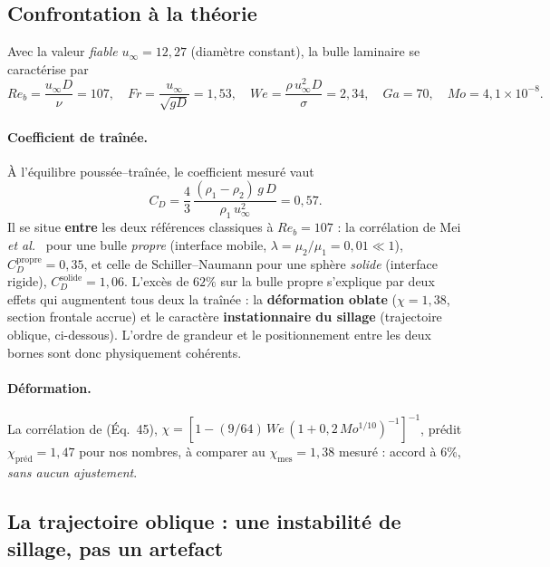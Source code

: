 \subsection{Confrontation à la théorie}
\label{subsec:theorie}

Avec la valeur \emph{fiable} $u_\infty = 12{,}27$ (diamètre constant), la bulle
laminaire se caractérise par
\begin{equation}
    Re_b = \frac{u_\infty D}{\nu} = 107, \quad
    Fr = \frac{u_\infty}{\sqrt{gD}} = 1{,}53, \quad
    We = \frac{\rho\,u_\infty^2 D}{\sigma} = 2{,}34, \quad
    Ga = 70, \quad Mo = 4{,}1\times10^{-8}.
\end{equation}

\paragraph{Coefficient de traînée.} À l'équilibre poussée--traînée, le coefficient
mesuré vaut
\begin{equation}
    C_D = \frac{4}{3}\,\frac{(\rho_1-\rho_2)\,g\,D}{\rho_1\,u_\infty^2} = 0{,}57.
\end{equation}
Il se situe \textbf{entre} les deux références classiques à $Re_b = 107$ : la
corrélation de Mei \emph{et al.}~\cite{mei1994} pour une bulle \emph{propre} (interface
mobile, $\lambda=\mu_2/\mu_1=0{,}01\ll1$), $C_D^{\text{propre}} = 0{,}35$, et celle
de Schiller--Naumann pour une sphère \emph{solide} (interface rigide),
$C_D^{\text{solide}} = 1{,}06$. L'excès de $62\%$ sur la bulle propre s'explique par
deux effets qui augmentent tous deux la traînée : la \textbf{déformation oblate}
($\chi = 1{,}38$, section frontale accrue) et le caractère \textbf{instationnaire du
sillage} (trajectoire oblique, ci-dessous). L'ordre de grandeur et le
positionnement entre les deux bornes sont donc physiquement cohérents.

\paragraph{Déformation.} La corrélation de \cite{legendre2025} (Éq.~45),
$\chi = [1 - (9/64)\,We\,(1+0{,}2\,Mo^{1/10})^{-1}]^{-1}$, prédit
$\chi_{\text{préd}} = 1{,}47$ pour nos nombres, à comparer au
$\chi_{\text{mes}} = 1{,}38$ mesuré : accord à $6\%$, \emph{sans aucun ajustement}.

\subsection{La trajectoire oblique : une instabilité de sillage, pas un artefact}

